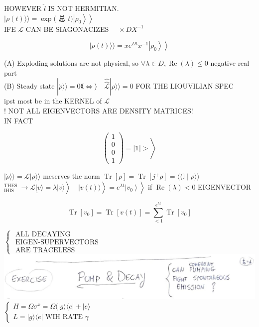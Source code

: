 \documentclass[10pt]{article}
\begin{document}
HOWEVER $\hat{l}$ IS NOT HERMITIAN.\\
$|\rho(t)\rangle\rangle=\exp ($ 总 $\left.t)\left|\rho_{0}\right\rangle\right\rangle$\\
IFE $\mathcal{L}$ CAN BE SIAGONACIZES $\quad \times D X^{-1}$

$$
\left.|\rho(t)\rangle\rangle=x e^{D t} x^{-1}\left|\rho_{0}\right\rangle\right\rangle
$$

(A) Exploding solutions are not physical, so $\forall \lambda \in D, \operatorname{Re}(\lambda) \leqslant 0$ negative real part\\
(B) Steady state $|\dot{p}\rangle\rangle=0 《 \Leftrightarrow\rangle \quad \hat{\hat{\mathcal{L}}}|\rho\rangle\rangle=0$ FOR THE LIOUVILIAN SPEC\\
ipst most be in the KERNEL of $\mathcal{L}$\\
! NOT ALL EIGENVECTORS ARE DENSITY MATRICES!\\
IN FACT

$$
\left.\left(\begin{array}{l}
1 \\
0 \\
0 \\
1
\end{array}\right)=|\mathbb{1}|>\right\rangle
$$

$|\dot{\rho}\rangle\rangle=\mathcal{L}|\rho\rangle\rangle$ meserves the norm $\operatorname{Tr}[\rho]=\operatorname{Tr}\left[j^{+} \rho\right]=\langle\langle\mathbb{I} \mid \rho\rangle\rangle$\\
$\left.\left.\left.{ }_{\text {IHIS }}^{\text {THES }} \rightarrow \underline{\mathcal{L}|v\rangle}=\lambda|v\rangle\right\rangle \quad|v(t)\rangle\right\rangle=e^{\lambda t}\left|v_{0}\right\rangle\right\rangle$ if $\operatorname{Re}(\lambda)<0$ EIGENVECTOR

$$
\operatorname{Tr}\left[v_{0}\right]=\operatorname{Tr}[v(t)]=\sum_{<1}^{e^{\lambda t}} \operatorname{Tr}\left[v_{0}\right]
$$

$\left\{\begin{array}{l}\text { ALL DECAYING } \\ \text { EIGEN-SUPERVECTORS } \\ \text { ARE TRACELESS }\end{array}\right.$\\
\includegraphics[max width=\textwidth, center]{2025_10_16_1bd50d0393172dac5e59g-12(1)}\\
$\left\{\begin{array}{l}H=\Omega \sigma^{x}=\Omega(|g\rangle\langle e|+|e\rangle \\ L=|g\rangle\langle e| \text { WIH RATE } \gamma\end{array}\right.$
\end{document}
